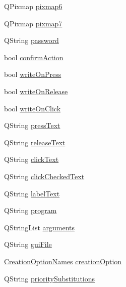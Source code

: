 \begin{DoxyCompactItemize}
\item 
QPixmap \hyperlink{classQERadioButton_ab853c55e9253e0807aa264d3a631827c}{pixmap6}
\item 
QPixmap \hyperlink{classQERadioButton_aed4591af2dbf39278086d296f3e8db7e}{pixmap7}
\item 
QString \hyperlink{classQERadioButton_a5c2a86f59174b8993c21cdb82535436f}{password}
\item 
bool \hyperlink{classQERadioButton_ab44cfab36427aff037f31420a7121fd7}{confirmAction}
\item 
bool \hyperlink{classQERadioButton_abc935229d195497727f4c18a3fd589f0}{writeOnPress}
\item 
bool \hyperlink{classQERadioButton_a5b414910f53e8d584e1ccbdb3c813b26}{writeOnRelease}
\item 
bool \hyperlink{classQERadioButton_afb7aded1c494314dda17c699ad8cfecb}{writeOnClick}
\item 
QString \hyperlink{classQERadioButton_a3eda04a8d01c637711866008838ec71e}{pressText}
\item 
QString \hyperlink{classQERadioButton_a5e0edea929429e6d0ba6bc8e6013ae7b}{releaseText}
\item 
QString \hyperlink{classQERadioButton_a0e01a1f96bdf5c10665bba5746ea5f99}{clickText}
\item 
QString \hyperlink{classQERadioButton_a9216f3b8c8190c929a55abbb003d4020}{clickCheckedText}
\item 
QString \hyperlink{classQERadioButton_a973fe8b514687003017bb7d9ba5ea4ed}{labelText}
\item 
QString \hyperlink{classQERadioButton_ac2bf379502ab5aa55f63fa2737dc9f7b}{program}
\item 
QStringList \hyperlink{classQERadioButton_aa3b16b50a571d339ca359ba54fd4afa8}{arguments}
\item 
QString \hyperlink{classQERadioButton_ad29930595b0e32554faaaf0c56d2d2e5}{guiFile}
\item 
\hyperlink{classQERadioButton_acb27e9a0a6626e356c5da293352c41c6}{CreationOptionNames} \hyperlink{classQERadioButton_a3bbdb5f0fa63690f2e97491e8bfab454}{creationOption}
\item 
QString \hyperlink{classQERadioButton_a83f29517bee8952e95d85d6ad6ddb89c}{prioritySubstitutions}
\end{DoxyCompactItemize}



